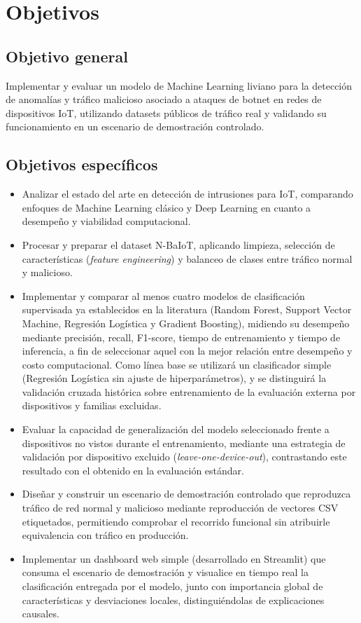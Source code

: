\documentclass[11pt,a4paper]{article}
\begin{document}
\section{Objetivos}

\subsection{Objetivo general}
Implementar y evaluar un modelo de Machine Learning liviano para la detección de anomalías y tráfico malicioso asociado a ataques de botnet en redes de dispositivos IoT, utilizando datasets públicos de tráfico real y validando su funcionamiento en un escenario de demostración controlado.

\subsection{Objetivos específicos}
\begin{itemize}
  \item Analizar el estado del arte en detección de intrusiones para IoT, comparando enfoques de Machine Learning clásico y Deep Learning en cuanto a desempeño y viabilidad computacional.
  \item Procesar y preparar el dataset N-BaIoT, aplicando limpieza, selección de características (\textit{feature engineering}) y balanceo de clases entre tráfico normal y malicioso.
  \item Implementar y comparar al menos cuatro modelos de clasificación supervisada ya establecidos en la literatura (Random Forest, Support Vector Machine, Regresión Logística y Gradient Boosting), midiendo su desempeño mediante precisión, recall, F1-score, tiempo de entrenamiento y tiempo de inferencia, a fin de seleccionar aquel con la mejor relación entre desempeño y costo computacional. Como línea base se utilizará un clasificador simple (Regresión Logística sin ajuste de hiperparámetros), y se distinguirá la validación cruzada histórica sobre entrenamiento de la evaluación externa por dispositivos y familias excluidas.
  \item Evaluar la capacidad de generalización del modelo seleccionado frente a dispositivos no vistos durante el entrenamiento, mediante una estrategia de validación por dispositivo excluido (\textit{leave-one-device-out}), contrastando este resultado con el obtenido en la evaluación estándar.
  \item Diseñar y construir un escenario de demostración controlado que reproduzca tráfico de red normal y malicioso mediante reproducción de vectores CSV etiquetados, permitiendo comprobar el recorrido funcional sin atribuirle equivalencia con tráfico en producción.
  \item Implementar un dashboard web simple (desarrollado en Streamlit) que consuma el escenario de demostración y visualice en tiempo real la clasificación entregada por el modelo, junto con importancia global de características y desviaciones locales, distinguiéndolas de explicaciones causales.
\end{itemize}
\end{document}
